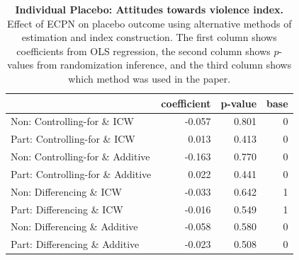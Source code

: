 \documentclass[
]{article}
\begin{document}
\begin{table}[H]
\begin{center}
\label{tab:pl_vio_ind}
\caption{\textbf{Individual Placebo: Attitudes towards violence index.} Effect of ECPN on placebo outcome using alternative methods of estimation and index construction. The first column shows coefficients from OLS regression, the second column shows $p$-values from randomization inference, and the third column shows which method was used in the paper.}
\smallskip

\begin{tabular}{l|r|r|r}
\hline
  & coefficient & p-value & base\\
\hline
Non: Controlling-for \& ICW & -0.057 & 0.801 & 0\\
\hline
Part: Controlling-for \& ICW & 0.013 & 0.413 & 0\\
\hline
Non: Controlling-for \& Additive & -0.163 & 0.770 & 0\\
\hline
Part: Controlling-for \& Additive & 0.022 & 0.441 & 0\\
\hline
Non: Differencing \& ICW & -0.033 & 0.642 & 1\\
\hline
Part: Differencing \& ICW & -0.016 & 0.549 & 1\\
\hline
Non: Differencing \& Additive & -0.058 & 0.580 & 0\\
\hline
Part: Differencing \& Additive & -0.023 & 0.508 & 0\\
\hline
\end{tabular}


\end{center}
\end{table}
\end{document}
